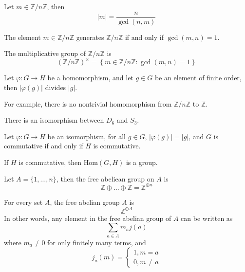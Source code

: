 \documentclass[openany]{book}
\newcommand{\Z}{\mathbb{Z}}
\begin{document}
\begin{prop}
    Let $m\in\Z/n\Z$, then 
    \begin{equation*}
        |m|=\frac{n}{\gcd(n,m)}
    \end{equation*} 
\end{prop}

\begin{cor}
    The element $m\in\Z/n\Z$ generates $\Z/n\Z$ if and only if $\gcd(m,n)=1$.
\end{cor}


\begin{defn}[Multiplicative $(\Z/n\Z)^\times$]
    The multiplicative group of $\Z/n\Z$ is 
    \begin{equation*}
        \left(\Z/n\Z\right)^\times=\left\{m\in\Z/n\Z: \gcd(m,n)=1\right\}
    \end{equation*}
\end{defn}

\begin{prop}
    Let $\varphi:G\to H$ be a homomorphism, and let $g\in G$ be an element of finite order, then $|\varphi(g)|$ divides $|g|$.

    For example, there is no nontrivial homomorphism from $\Z/n\Z$ to $\Z$.
\end{prop}

\begin{prop}
    There is an isomorphism between $D_6$ and $S_3$.
\end{prop}

\begin{prop}
    Let $\varphi: G\to H$ be an isomorphism, for all $g\in G$, $|\varphi(g)|=|g|$, and $G$ is commutative if and only if $H$ is commutative.
\end{prop}

\begin{prop}
    If $H$ is commutative, then $\text{Hom}(G,H) $ is a group.
\end{prop}

\begin{defn}
    Let $A=\{1,\dots, n\}$, then the free abeliean group on $A$ is 
    \begin{equation*}
        \Z\oplus\dots\oplus\Z=\Z^{\oplus n}
    \end{equation*}
\end{defn}
\begin{prop}
    For every set $A$, the free abelian group $A$ is 
    \begin{equation*}
        \Z^{\oplus A}
    \end{equation*}
    In other words, any element in the free abelian group of $A$ can be written as 
    \begin{equation*}
        \sum_{a\in A}m_aj(a)
    \end{equation*}
    where $m_a\neq 0$ for only finitely many terms, and 
    \begin{equation*}
        j_a(m)=\begin{cases}
            1, m=a\\
            0, m\neq a
        \end{cases}
    \end{equation*}
\end{prop}
\end{document}
